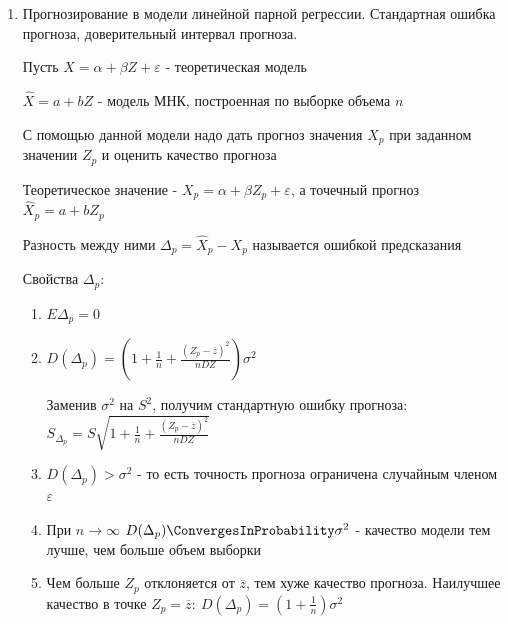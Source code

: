 \documentclass[12pt]{article}
\begin{document}
\begin{enumerate}
    \Defs $S_a$ и $S_b$ называются стандартным ошибками коэффициентов регрессии

    Пусть $t_\gamma$ - квантиль $|T_{n - 2}|$ уровня $\gamma$

    Тогда доверительные интервалы надежности $\gamma$ для параметров $\alpha$ и $\beta$:

    $\qquad \alpha: (a - t_\gamma S_a; a + t_\gamma S_a)$

    $\qquad \beta: (b - t_\gamma S_b; b + t_\gamma S_b)$

    \item Прогнозирование в модели линейной парной регрессии. Стандартная ошибка прогноза, доверительный интервал прогноза.

    Пусть $X = \alpha + \beta Z + \varepsilon$ - теоретическая модель

    $\hat X = a + b Z$ - модель МНК, построенная по выборке объема $n$

    С помощью данной модели надо дать прогноз значения $X_p$ при заданном значении $Z_p$ и оценить качество прогноза 

    Теоретическое значение - $X_p = \alpha + \beta Z_p + \varepsilon$, а точечный прогноз $\hat X_p = a + b Z_p$

    Разность между ними $\Delta_p = \hat X_p - X_p$ называется ошибкой предсказания

    Свойства $\Delta_p$:

    \begin{enumerate}
        \item $E \Delta_p = 0$
        \item $D (\Delta_p) = \left(1 + \frac{1}{n} + \frac{(Z_p - \overline{z})^2}{n DZ}\right) \sigma^2$

        Заменив $\sigma^2$ на $S^2$, получим стандартную ошибку прогноза: $S_{\Delta_p} = S \sqrt{1 + \frac{1}{n} + \frac{(Z_p - \overline{z})^2}{n DZ}}$

        \item $D(\Delta_p) > \sigma^2$ - то есть точность прогноза ограничена случайным членом $\varepsilon$

        \item При $n \to \infty$ $D(\Delta_p) \ConvergesInProbability \sigma^2$ - качество модели тем лучше, чем больше объем выборки

        \item Чем больше $Z_p$ отклоняется от $\overline{z}$, тем хуже качество прогноза. Наилучшее качество в точке $Z_p = \overline{z}: \ D(\Delta_p) = \left(1 + \frac{1}{n}\right) \sigma^2$


\end{enumerate}
\end{enumerate}
\end{document}
